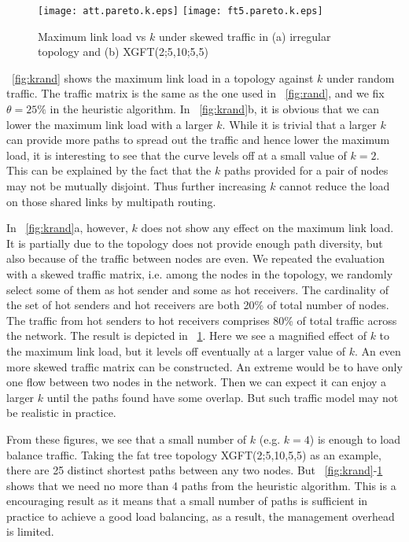 \documentclass[conference]{IEEEtran}
\begin{document}
\begin{figure}
\texttt{[image: att.pareto.k.eps]}%
\texttt{[image: ft5.pareto.k.eps]}
\caption{Maximum link load vs $k$ under skewed traffic in (a) irregular topology and (b) XGFT(2;5,10;5,5)}\label{fig:kpareto}
\end{figure}

\figurename~\ref{fig:krand} shows the maximum link load in a topology against
$k$ under random traffic. The traffic matrix is the same as the one used in
\figurename~\ref{fig:rand}, and we fix $\theta=25\%$ in the heuristic
algorithm. In \figurename~\ref{fig:krand}b, it is obvious that we can lower the
maximum link load with a larger $k$.  While it is trivial that a larger
$k$ can provide more paths to spread out the traffic and hence lower the
maximum load, it is interesting to see that the curve levels off at a small
value of $k=2$. This can be explained by the fact that the $k$ paths provided
for a pair of nodes may not be mutually disjoint.  Thus further increasing $k$
cannot reduce the load on those shared links by multipath routing.

In \figurename~\ref{fig:krand}a, however, $k$ does not show any effect on the
maximum link load. It is partially due to the topology does not provide enough
path diversity, but also because of the traffic between nodes are even. We
repeated the evaluation with a skewed traffic matrix, i.e. among the nodes in
the topology, we randomly select some of them as hot sender and some as hot
receivers. The cardinality of the set of hot senders and hot receivers are both
20\% of total number of nodes. The traffic from hot senders to hot receivers
comprises 80\% of total traffic across the network. The result is depicted in
\figurename~\ref{fig:kpareto}. Here we see a magnified effect of $k$ to the
maximum link load, but it levels off eventually at a larger value of $k$. An
even more skewed traffic matrix can be constructed. An extreme would be to have
only one flow between two nodes in the network. Then we can expect it can enjoy
a larger $k$ until the paths found have some overlap. But such traffic model
may not be realistic in practice.

From these figures, we see that a small number of $k$ (e.g. $k=4$) is enough to
load balance traffic. Taking the fat tree topology XGFT(2;5,10,5,5) as an
example, there are 25 distinct shortest paths between any two nodes. But
\figurename~\ref{fig:krand}-\ref{fig:kpareto} shows that we need no more than 4
paths from the heuristic algorithm. This is a encouraging result as it means
that a small number of paths is sufficient in practice to achieve a good load
balancing, as a result, the management overhead is limited.
\end{document}
